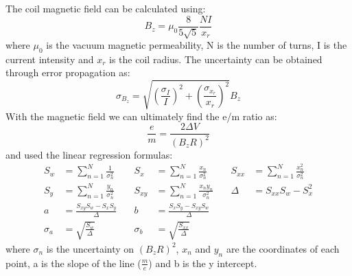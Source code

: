 The coil magnetic field can be calculated using:
\begin{equation*}
    B_z=\mu_0\frac{8}{5\sqrt{5}}\frac{NI}{x_r}
\end{equation*}
where $\mu_0$ is the vacuum magnetic permeability, N is the number of turns, I is the current intensity and $x_r$ is the coil radius. The uncertainty can be obtained through error propagation as:
\begin{equation*}
    \sigma_{B_z}=\sqrt{(\frac{\sigma_I}{I})^2+(\frac{\sigma_{x_r}}{x_r})^2}B_z
\end{equation*}
With the magnetic field we can ultimately find the e/m ratio as:
\begin{equation*}
    \frac{e}{m}=\frac{2\Delta V}{(B_zR)^2}
\end{equation*}
and used the linear regression formulas:
\begin{align*}
S_w &= \sum_{n=1}^N \frac{1}{\sigma_n^2} & \quad S_x &= \sum_{n=1}^N \frac{x_n}{\sigma_n^2} & \quad S_{xx} &= \sum_{n=1}^N \frac{x_n^2}{\sigma_n^2} \\
S_y &= \sum_{n=1}^N \frac{y_n}{\sigma_n^2} & \quad S_{xy} &= \sum_{n=1}^N \frac{x_n y_n}{\sigma_n^2}  & \quad \Delta &= S_{xx} S_w - S_x^2 \\
a &= \frac{S_{xy} S_w - S_x S_y}{\Delta} & \quad b &= \frac{S_x S_y - S_{xy} S_w}{\Delta} \\
\sigma_a &= \sqrt{\frac{S_w}{\Delta}} & \quad \sigma_b &= \sqrt{\frac{S_{xx}}{\Delta}} 
\end{align*}
where  $\sigma_n$ is the uncertainty on $(B_zR)^2$, $x_n$ and  $y_n$ are the coordinates of each point, a is the slope of the line ($\frac{m}{e}$) and b is the y intercept.
